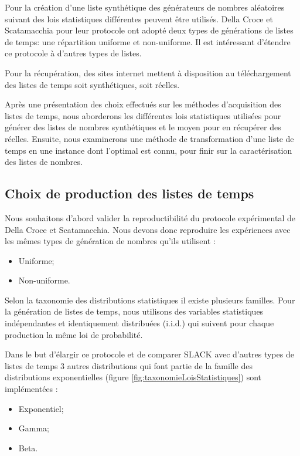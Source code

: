 \documentclass[a4paper,12pt]{report}
\theoremstyle{plain}				%
\theoremstyle{definition}				%
\newcommand\dcs{Della Croce et Scatamacchia\xspace}
\newcommand{\lp}[1]{\todo[author=LP,color=yellow,inline]{#1}}
\begin{document}
Pour la création d'une liste synthétique des générateurs de nombres aléatoires suivant des lois statistiques différentes peuvent être utilisés.  
\dcs pour leur protocole ont adopté deux types de générations de listes de temps: 
  une répartition uniforme et non-uniforme.
Il est intéressant d'étendre ce protocole à d'autres types de listes.

Pour la récupération, des sites internet mettent à disposition au téléchargement des listes de temps soit synthétiques, soit réelles. 
  
\bigskip
Après une présentation des choix effectués sur les méthodes d'acquisition des listes de temps, 
nous aborderons les différentes lois statistiques utilisées pour générer des listes de nombres synthétiques 
et le moyen  pour en récupérer des réelles. Ensuite, nous examinerons une méthode de transformation d'une liste de temps en une instance dont l'optimal est connu, pour finir sur la caractérisation des listes de nombres.  


\subsection{Choix de production des listes de temps}\label{ssec:instancesChoixProduction}

Nous souhaitons d'abord valider la reproductibilité du protocole expérimental de \dcs. Nous devons donc reproduire les expériences avec les mêmes types de génération de nombres qu'ils utilisent : 
\begin{itemize}
	\item Uniforme; 
	\item Non-uniforme.
\end{itemize}

Selon la taxonomie des distributions statistiques \cite{nielsen2009statistical} il existe plusieurs familles. 
Pour la génération de listes de temps, nous utilisons des variables statistiques indépendantes et 
  identiquement distribuées (i.i.d.) qui suivent pour chaque production la même loi de probabilité.

Dans le but d'élargir ce protocole et de comparer SLACK avec d'autres types de listes de temps 3 autres distributions qui font partie de la famille des distributions exponentielles 
(figure \ref{fig:taxonomieLoisStatistiques}) sont implémentées :
\begin{itemize}
	\item Exponentiel;
	\item Gamma;
	\item Beta.
\end{itemize}
\end{document}
